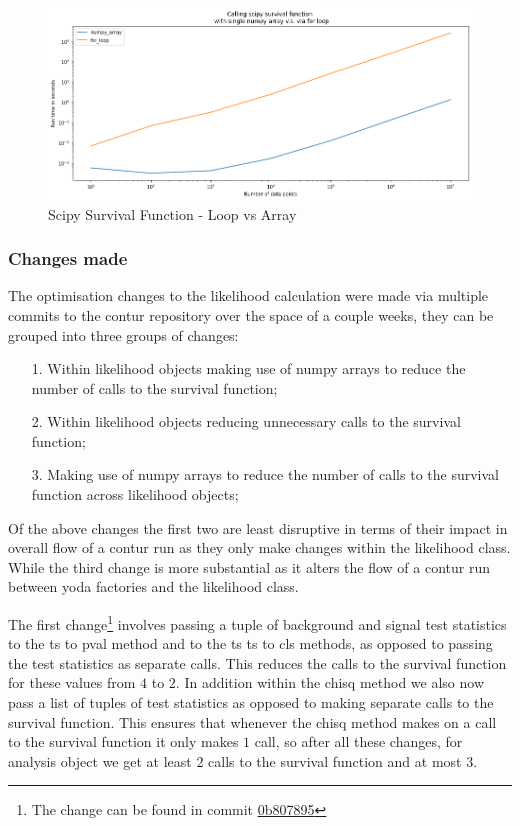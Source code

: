 \begin{figure}[H]
\centering
\includegraphics[scale=0.5]{plots/scipy_profile.png}
\caption{Scipy Survival Function - Loop vs Array}
\label{fig:loop_v_array}
\end{figure} 

\subsubsection{Changes made}
The optimisation changes to the likelihood calculation were made via multiple commits to the contur repository over the space of a couple weeks, they can be grouped into three groups of changes:

\begin{itemize}
\item[1.] Within likelihood objects making use of numpy arrays to reduce the number of calls to the survival function;
\item[2.] Within likelihood objects reducing unnecessary calls to the survival function;
\item[3.] Making use of numpy arrays to reduce the number of calls to the survival function across likelihood objects;
\end{itemize}

Of the above changes the first two are least disruptive in terms of their impact in overall flow of a contur run as they only make changes within the likelihood class. While the third change is more substantial as it alters the flow of a contur run between yoda factories and the likelihood class.

The first change\footnote{The change can be found in commit \href{https://gitlab.com/hepcedar/contur/-/commit/0b80789580cd0529bfdce28d2bae252755c45a63}{0b807895}} involves passing a tuple of background and signal test statistics to the ts to pval method and to the ts ts to cls methods, as opposed to passing the test statistics as separate calls. This reduces the calls to the survival function for these values from $4$ to $2$. In addition within the chisq method we also now pass a list of tuples of test statistics as opposed to making separate calls to the survival function. This ensures that whenever the chisq method makes on a call to the survival function it only makes $1$ call, so after all these changes, for analysis object we get at least $2$ calls to the survival function and at most $3$.


